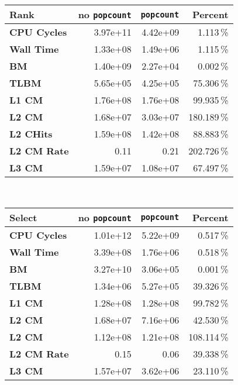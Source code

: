 \begin{tabular}{|lrrr|}
\hline
\textbf{Rank} & no \texttt{popcount} & \texttt{popcount} & Percent \\ \hline
\textbf{CPU Cycles} & 3.97e+11 & 4.42e+09 & 1.113\,\% \\ \hline
\textbf{Wall Time} & 1.33e+08 & 1.49e+06 & 1.115\,\% \\ \hline
\textbf{BM} & 1.40e+09 & 2.27e+04 & 0.002\,\% \\ \hline
\textbf{TLBM} & 5.65e+05 & 4.25e+05 & 75.306\,\% \\ \hline
\textbf{L1 CM} & 1.76e+08 & 1.76e+08 & 99.935\,\% \\ \hline
\textbf{L2 CM} & 1.68e+07 & 3.03e+07 & 180.189\,\% \\ \hline
\textbf{L2 CHits} & 1.59e+08 & 1.42e+08 & 88.883\,\% \\ \hline
\textbf{L2 CM Rate} & 0.11 & 0.21 & 202.726\,\% \\ \hline
\textbf{L3 CM} & 1.59e+07 & 1.08e+07 & 67.497\,\% \\ \hline
\end{tabular}\\[5pt]
\begin{tabular}{|lrrr|}
\hline
\textbf{Select} & no \texttt{popcount} & \texttt{popcount} & Percent \\ \hline
\textbf{CPU Cycles} & 1.01e+12 & 5.22e+09 & 0.517\,\% \\ \hline
\textbf{Wall Time} & 3.39e+08 & 1.76e+06 & 0.518\,\% \\ \hline
\textbf{BM} & 3.27e+10 & 3.06e+05 & 0.001\,\% \\ \hline
\textbf{TLBM} & 1.34e+06 & 5.27e+05 & 39.326\,\% \\ \hline
\textbf{L1 CM} & 1.28e+08 & 1.28e+08 & 99.782\,\% \\ \hline
\textbf{L2 CM} & 1.68e+07 & 7.16e+06 & 42.530\,\% \\ \hline
\textbf{L2 CM} & 1.12e+08 & 1.21e+08 & 108.114\,\% \\ \hline
\textbf{L2 CM Rate} & 0.15 & 0.06 & 39.338\,\% \\ \hline
\textbf{L3 CM} & 1.57e+07 & 3.62e+06 & 23.110\,\% \\ \hline
\end{tabular}\\[5pt]
